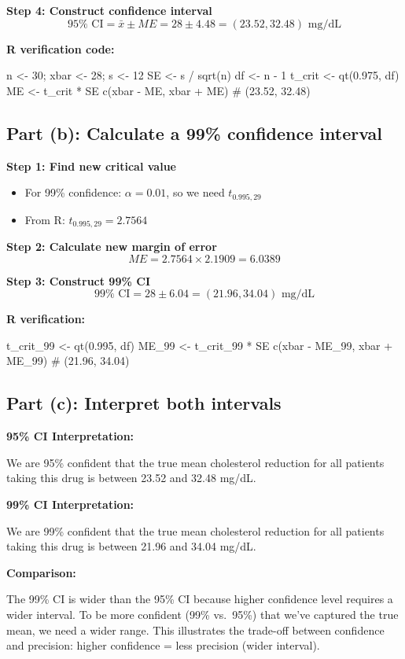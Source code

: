 \documentclass[11pt]{article}
\begin{document}
\textbf{Step 4: Construct confidence interval}
$$95\% \text{ CI} = \bar{x} \pm ME = 28 \pm 4.48 = (23.52, 32.48) \text{ mg/dL}$$

\textbf{R verification code:}
\begin{rcode}
n <- 30; xbar <- 28; s <- 12
SE <- s / sqrt(n)
df <- n - 1
t_crit <- qt(0.975, df)
ME <- t_crit * SE
c(xbar - ME, xbar + ME)  # (23.52, 32.48)
\end{rcode}

\subsection*{Part (b): Calculate a 99\% confidence interval}

\textbf{Step 1: Find new critical value}
\begin{itemize}
\item For 99\% confidence: $\alpha = 0.01$, so we need $t_{0.995, 29}$
\item From R: $t_{0.995, 29} = 2.7564$
\end{itemize}

\textbf{Step 2: Calculate new margin of error}
$$ME = 2.7564 \times 2.1909 = 6.0389$$

\textbf{Step 3: Construct 99\% CI}
$$99\% \text{ CI} = 28 \pm 6.04 = (21.96, 34.04) \text{ mg/dL}$$

\textbf{R verification:}
\begin{rcode}
t_crit_99 <- qt(0.995, df)
ME_99 <- t_crit_99 * SE
c(xbar - ME_99, xbar + ME_99)  # (21.96, 34.04)
\end{rcode}

\subsection*{Part (c): Interpret both intervals}

\textbf{95\% CI Interpretation:}

We are 95\% confident that the true mean cholesterol reduction for all patients taking this drug is between 23.52 and 32.48 mg/dL.

\textbf{99\% CI Interpretation:}

We are 99\% confident that the true mean cholesterol reduction for all patients taking this drug is between 21.96 and 34.04 mg/dL.

\textbf{Comparison:}

The 99\% CI is wider than the 95\% CI because higher confidence level requires a wider interval. To be more confident (99\% vs.\ 95\%) that we've captured the true mean, we need a wider range. This illustrates the trade-off between confidence and precision: higher confidence = less precision (wider interval).
\end{document}
